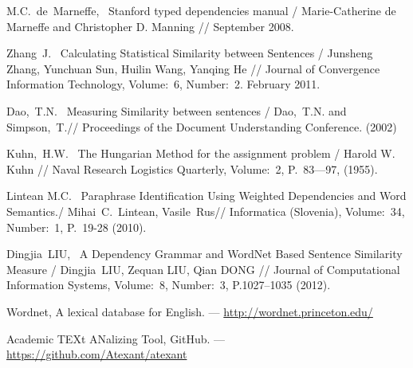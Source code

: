 M.C.~de~Marneffe,~
Stanford typed dependencies manual /
Marie-Catherine de Marneffe and Christopher D. Manning //
September 2008.

Zhang~J.~
Calculating Statistical Similarity between Sentences /
Junsheng Zhang, Yunchuan Sun, Huilin Wang, Yanqing He //
Journal of Convergence Information Technology,
Volume:~6, Number:~2. February 2011.

Dao,~T.N.~
Measuring Similarity between sentences /
Dao,~T.N. and Simpson,~T.//
Proceedings of the Document Understanding Conference. (2002)

Kuhn,~H.W.~
The Hungarian Method for the assignment problem /
Harold W. Kuhn // 
Naval Research Logistics Quarterly,
Volume:~2, P.~83—97, (1955).

Lintean M.C.~
Paraphrase Identification Using Weighted Dependencies and Word Semantics./
Mihai~C.~Lintean, Vasile~Rus//
Informatica (Slovenia),
Volume:~34, Number:~1, P.~19-28 (2010).

Dingjia~LIU,~
A Dependency Grammar and WordNet Based Sentence Similarity Measure /
Dingjia~LIU, Zequan LIU, Qian DONG //
Journal of Computational Information Systems, 
Volume:~8, Number:~3, P.1027–1035 (2012).

Wordnet, A lexical database for English. ---
\url{http://wordnet.princeton.edu/}

Academic TEXt ANalizing Tool, GitHub. ---~
\url{https://github.com/Atexant/atexant}
